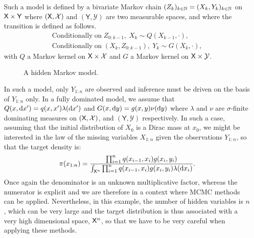 \documentclass[english,graybox,envcountchap,envcountsame,sectrefs,shortlabels]{svmono}
\theoremstyle{style}
\newcommand{\Yset}{\mathsf{Y}}
\newcommand{\Ysigma}{\mathcal{Y}}
\begin{document}
\begin{example}
Such a model is defined by a bivariate Markov chain $(Z_k)_{k\in\mathbb{N}}=(X_k,Y_k)_{k\in\mathbb{N}}$ on $\Xset\times\Yset$ where $(\mathsf{X},\mathcal{X})$ and $(\Yset,\Ysigma)$ are two measurable spaces, and where the transition is defined as follows.
\begin{align*}
\mathrm{Conditionally \; on \;} Z_{0:k-1}, \; X_k \sim Q(X_{k-1},\cdot),\\
\mathrm{Conditionally \; on \; } (X_k,Z_{0:k-1}), \;  Y_k \sim G(X_k,\cdot),
\end{align*}
with $Q$  a Markov kernel on $\mathsf{X} \times \mathcal{X}$ and $G$  a Markov kernel on $\Xset \times \Ysigma$.


\begin{figure}[!h]
\begin{center}
\end{center}
\caption{A hidden Markov model.}
\label{hmm}
\end{figure}
In such a model, only $Y_{1:n}$ are observed and inference must be driven on the basis of $Y_{1:n}$ only. 
In a fully dominated model, we assume that $Q(x,\mathrm{d} x')=q(x,x') \lambda(\mathrm{d} x')$ and $G(x,\mathrm{d} y)=g(x,y) \nu(\mathrm{d} y)$ where $\lambda$ and $\nu$ are $\sigma$-finite dominating measures on $(\mathsf{X},\mathcal{X})$, and $(\Yset, \Ysigma)$ respectively. In such a case, assuming that the initial distribution of $X_0$ is a Dirac mass at $x_0$, we might be interested in the law of the missing variables $X_{1:n}$ given the observations $Y_{1:n}$, so that the target density is:
$$
\pi(x_{1:n})=\frac{\prod_{i=1}^{n} q(x_{i-1},x_i)g(x_i,y_i)}{\int_{\mathsf{X}^n} \prod_{i=1}^{n} q(x_{i-1},x_i)g(x_i,y_i) \lambda(\mathrm{d} x_i)}.
$$
Once again the denominator is an unknown multiplicative factor, whereas the numerator is explicit and we are therefore in a context where MCMC methods can be applied. Nevertheless, in this example, the number of hidden variables is $n$, which can be very large and the target distribution is thus associated with a very high dimensional space, $\mathsf{X}^n$, so that we have to be very careful when applying these methods.
\end{example}
\end{document}
